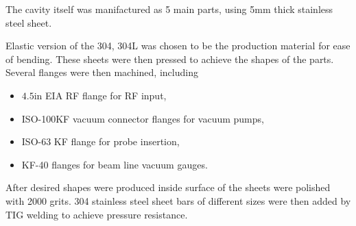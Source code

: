 \documentclass{book}
\begin{document}
The cavity itself was manifactured as 5 main parts, using 5mm thick stainless steel sheet. 

Elastic version of the 304, 304L was chosen to be the production material for ease of bending.
These sheets were then pressed to achieve the shapes of the parts. 
Several flanges were then machined, including
\begin{itemize}
    \item $4.5$in EIA RF flange for RF input,
    \item ISO-100KF vacuum connector flanges for vacuum pumps,
    \item ISO-63 KF flange for probe insertion,
    \item KF-40 flanges for beam line vacuum gauges.
\end{itemize}
After desired shapes were produced inside surface of the sheets were polished with 2000 grits. 
304 stainless steel sheet bars of different sizes were then added by 
TIG welding to achieve pressure resistance.
\end{document}
